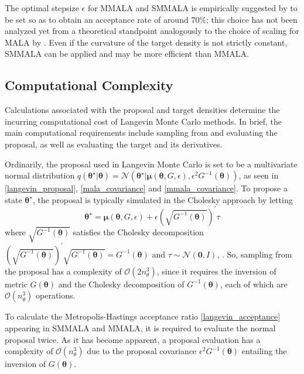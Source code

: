 \documentclass[twoside,11pt]{article}
\begin{document}
The optimal stepsize $\epsilon$ for MMALA and SMMALA is empirically suggested by \cite{gir_cal__rie} to be set so as to 
obtain an acceptance rate of around $70\%$; this choice has not been analyzed yet from a theoretical standpoint analogously 
to the choice of scaling for MALA by \cite{rob_ros__opt}. Even if the curvature of the target density is not strictly 
constant, SMMALA can be applied and may be more efficient than MMALA.

\subsection{Computational Complexity}
\label{Motivation}

Calculations associated with the proposal and target densities determine the incurring computational cost of Langevin 
Monte Carlo methods. In brief, the main computational requirements include sampling from and evaluating the proposal, as well
as evaluating the target and its derivatives.

Ordinarily, the proposal used in Langevin Monte Carlo is set to be a multivariate normal distribution
$
q(\boldsymbol{\theta}^{\star}|\boldsymbol{\theta}) =
\mathcal{N}(\boldsymbol{\theta}^{\star}|
\boldsymbol{\mu}(\boldsymbol{\theta}, G, \epsilon), \epsilon^2 G^{-1}(\boldsymbol{\theta}))
$,
as seen in \eqref{langevin_proposal}, \eqref{mala_covariance} and \eqref{mmala_covariance}. To propose a state 
$\boldsymbol{\theta}^{\star}$, the proposal is typically simulated in the Cholesky approach by letting
\begin{equation}
\boldsymbol{\theta}^{\star} =
\boldsymbol{\mu}(\boldsymbol{\theta}, G, \epsilon)+
\epsilon \left(\sqrt{G^{-1}(\boldsymbol{\theta})}\right)^{'}\tau
\end{equation}
where $\sqrt{G^{-1}(\boldsymbol{\theta})}$ satisfies the Cholesky decomposition
$
\left(\sqrt{G^{-1}(\boldsymbol{\theta})}\right)^{'}\sqrt{G^{-1}(\boldsymbol{\theta})}=
G^{-1}(\boldsymbol{\theta})
$
and $\tau\sim\mathcal{N}(\mathbf{0}, I)$, \cite{chi_gre__und}.
So, sampling from the proposal has a complexity of $\mathcal{O}(2n_\theta^3)$, since it requires the inversion of metric 
$G(\boldsymbol{\theta})$ and the Cholesky decomposition of $G^{-1}(\boldsymbol{\theta})$, each of which are
$\mathcal{O}(n_\theta^3)$ operations.

To calculate the Metropolis-Hastings acceptance ratio \eqref{langevin_acceptance} appearing in SMMALA and MMALA,
it is required to evaluate the normal proposal twice. As it has become apparent, a proposal evaluation has a complexity of
$\mathcal{O}(n_\theta^3)$ due to the proposal covariance $\epsilon^2 G^{-1}(\boldsymbol{\theta})$ entailing the inversion of 
$G(\boldsymbol{\theta})$.
\end{document}
